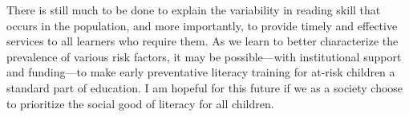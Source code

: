 \documentclass[../uwthesis.tex]{subfiles}
\begin{document}
\begin{itemize}
\end{itemize}

There is still much to be done to explain the variability in reading skill that occurs in the population, and more importantly, to provide timely and effective services to all learners who require them. As we learn to better characterize the prevalence of various risk factors, it may be possible---with institutional support and funding---to make early preventative literacy training for at-risk children a standard part of education. I am hopeful for this future if we as a society choose to prioritize the social good of literacy for all children. 
\end{document}
